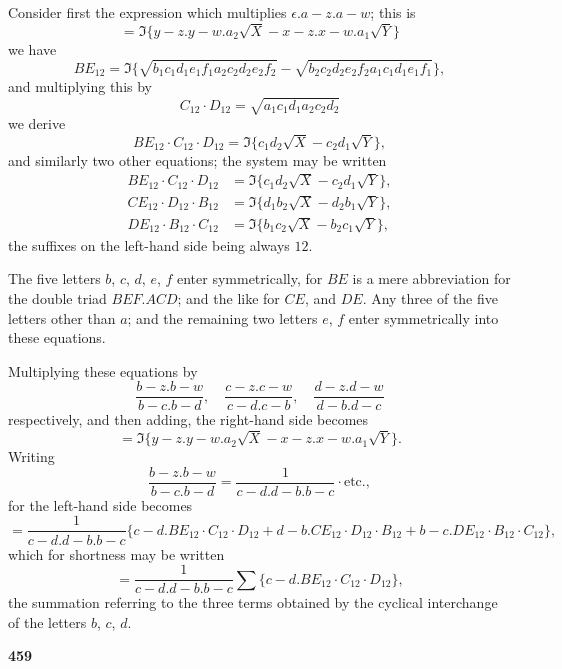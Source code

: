 \documentclass[11pt,a4paper]{book}
\begin{document}
Consider first the expression which multiplies $\epsilon . a - z . a - w$; this is
\[
= \Im\{y - z . y - w . a_2 \sqrt{X} - x - z . x - w . a_1 \sqrt{Y}\}
\]
we have
\[
BE_{12} = \Im\{\sqrt{b_1 c_1 d_1 e_1 f_1 a_2 c_2 d_2 e_2 f_2} - \sqrt{b_2 c_2 d_2 e_2 f_2 a_1 c_1 d_1 e_1 f_1}\},
\]
and multiplying this by
\[
C_{12} \cdot D_{12} = \sqrt{a_1 c_1 d_1 a_2 c_2 d_2}
\]
we derive
\[
BE_{12} \cdot C_{12} \cdot D_{12} = \Im\{c_1 d_2 \sqrt{X} - c_2 d_1 \sqrt{Y}\},
\]
and similarly two other equations; the system may be written
\begin{align*}
BE_{12} \cdot C_{12} \cdot D_{12} &= \Im\{c_1 d_2 \sqrt{X} - c_2 d_1 \sqrt{Y}\}, \\
CE_{12} \cdot D_{12} \cdot B_{12} &= \Im\{d_1 b_2 \sqrt{X} - d_2 b_1 \sqrt{Y}\}, \\
DE_{12} \cdot B_{12} \cdot C_{12} &= \Im\{b_1 c_2 \sqrt{X} - b_2 c_1 \sqrt{Y}\},
\end{align*}
the suffixes on the left-hand side being always $12$.

The five letters $b$, $c$, $d$, $e$, $f$ enter symmetrically, for $BE$ is a mere abbreviation for the double triad $BEF.ACD$; and the like for $CE$, and $DE$. Any three of the five letters other than $a$; and the remaining two letters $e$, $f$ enter symmetrically into these equations.

Multiplying these equations by
\[
\frac{b - z . b - w}{b - c . b - d},\quad \frac{c - z . c - w}{c - d . c - b},\quad \frac{d - z . d - w}{d - b . d - c}
\]
respectively, and then adding, the right-hand side becomes
\[
= \Im\{y - z . y - w . a_2 \sqrt{X} - x - z . x - w . a_1 \sqrt{Y}\}.
\]
Writing
\[
\frac{b - z . b - w}{b - c . b - d} = \frac{1}{c - d . d - b . b - c} \cdot \text{etc.},
\]
for the left-hand side becomes
\[
= \frac{1}{c - d . d - b . b - c} \{c - d . BE_{12} \cdot C_{12} \cdot D_{12} + d - b . CE_{12} \cdot D_{12} \cdot B_{12} + b - c . DE_{12} \cdot B_{12} \cdot C_{12}\},
\]
which for shortness may be written
\[
= \frac{1}{c - d . d - b . b - c} \sum\{c - d . BE_{12} \cdot C_{12} \cdot D_{12}\},
\]
the summation referring to the three terms obtained by the cyclical interchange of the letters $b$, $c$, $d$.

\vspace{1em}

\begin{center}
\textbf{459}
\end{center}

\vspace{0.5em}
\end{document}
